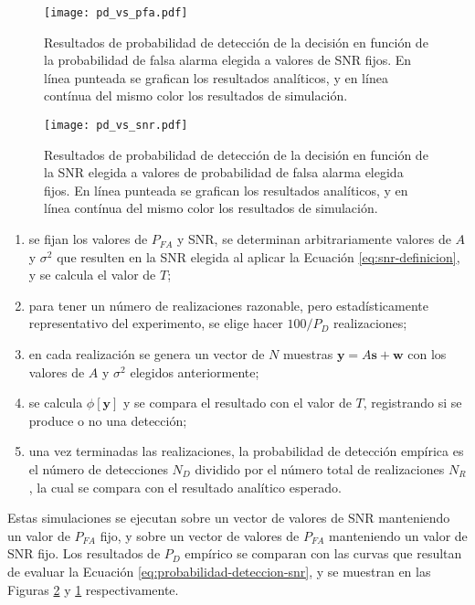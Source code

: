 \begin{figure}[t]
    \centering{}\texttt{[image: pd\_vs\_pfa.pdf]}
    \caption[Probabilidad de detección en función de la probabilidad de falsa alarma elegida a valores de SNR fijos.]{Resultados de probabilidad de detección de la decisión en función de la probabilidad de falsa alarma elegida a valores de SNR fijos. En línea punteada se grafican los resultados analíticos, y en línea contínua del mismo color los resultados de simulación.\label{fig:pd-vs-pfa}}
\end{figure}
\begin{figure}[t]
    \centering{}\texttt{[image: pd\_vs\_snr.pdf]}
    \caption[Probabilidad de detección en función de la SNR elegida a valores de probabilidad de falsa alarma elegida fijos.]{Resultados de probabilidad de detección de la decisión en función de la SNR elegida a valores de probabilidad de falsa alarma elegida fijos. En línea punteada se grafican los resultados analíticos, y en línea contínua del mismo color los resultados de simulación.\label{fig:pd-vs-snr}}  
\end{figure}

\begin{enumerate}
    \item se fijan los valores de $P_{FA}$ y SNR, se determinan arbitrariamente valores de $A$ y $\sigma^2$ que resulten en la SNR elegida al aplicar la Ecuación \ref{eq:snr-definicion}, y se calcula el valor de $T$;
    \item para tener un número de realizaciones razonable, pero estadísticamente representativo del experimento, se elige hacer $100/P_D$ realizaciones;
    \item en cada realización se genera un vector de $N$ muestras $\mathbf{y} = A\mathbf{s}+\mathbf{w}$ con los valores de $A$ y $\sigma^2$ elegidos anteriormente;
    \item se calcula $\phi[\mathbf{y}]$ y se compara el resultado con el valor de $T$, registrando si se produce o no una detección;
    \item una vez terminadas las realizaciones, la probabilidad de detección empírica es el número de detecciones $N_D$ dividido por el número total de realizaciones $N_R$, la cual se compara con el resultado analítico esperado.
\end{enumerate}

Estas simulaciones se ejecutan sobre un vector de valores de SNR manteniendo un valor de $P_{FA}$ fijo, y sobre un vector de valores de $P_{FA}$ manteniendo un valor de SNR fijo. Los resultados de $P_D$ empírico se comparan con las curvas que resultan de evaluar la Ecuación \ref{eq:probabilidad-deteccion-snr}, y se muestran en las Figuras \ref{fig:pd-vs-snr} y \ref{fig:pd-vs-pfa} respectivamente. 

